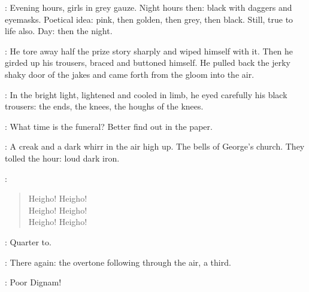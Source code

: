 \BloomInt:
Evening hours,
girls in grey gauze.
Night hours then:
black with daggers and eyemasks.
Poetical idea:
pink, then golden, then grey, then black.
Still, true to life also.
Day: then the night.

:
He tore away half the prize story sharply and wiped himself with it.
Then he girded up his trousers, braced and buttoned himself.
He pulled back the jerky shaky door of the jakes
and came forth from the gloom into the air.

:
In the bright light,
lightened and cooled in limb,
he eyed carefully his black trousers:
the ends, the knees, the houghs of the knees.

\BloomInt:
What time is the funeral?
Better find out in the paper.

:
A creak and a dark whirr in the air high up.
The bells of George's church.
They tolled the hour:
loud dark iron.

:
\begin{verse}
    Heigho! Heigho! \\
    Heigho! Heigho! \\
    Heigho! Heigho!
\end{verse}

\BloomInt:
Quarter to.

:
There again:
the overtone following through the air,
a third.

\BloomInt:
Poor Dignam!
